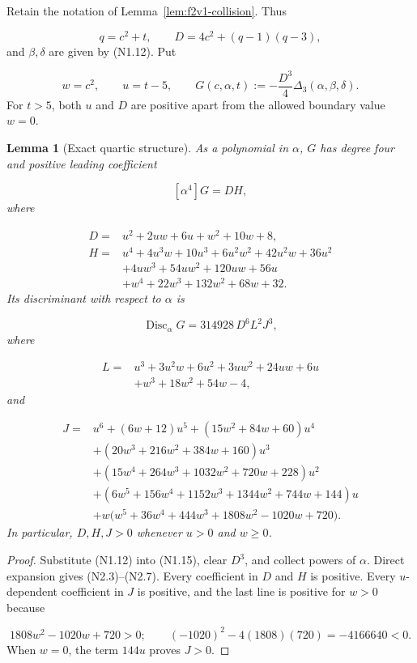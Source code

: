 \documentclass[11pt]{article}
\newtheorem{lemma}[theorem]{Lemma}
\theoremstyle{definition}
\theoremstyle{remark}
\begin{document}
Retain the notation of Lemma~\ref{lem:f2v1-collision}.  Thus

\[
 q=c^2+t,\qquad
 D=4c^2+(q-1)(q-3),
 \tag{N2.1}
\]
and \(\beta,\delta\) are given by \textup{(N1.12)}.  Put

\[
 w=c^2,\qquad u=t-5,
 \qquad
 G(c,\alpha,t):=-\frac{D^3}{4}
 \Delta_3(\alpha,\beta,\delta).
 \tag{N2.2}
\]
For \(t>5\), both \(u\) and \(D\) are positive apart from the allowed
boundary value \(w=0\).

\begin{lemma}[Exact quartic structure]
\label{lem:f2v2-structure}
As a polynomial in \(\alpha\), \(G\) has degree four and positive leading
coefficient

\[
 [\alpha^4]G=D H,
 \tag{N2.3}
\]
where

\[
\begin{aligned}
D={}&u^2+2uw+6u+w^2+10w+8,\\
H={}&u^4+4u^3w+10u^3+6u^2w^2+42u^2w+36u^2\\
 &+4uw^3+54uw^2+120uw+56u\\
 &+w^4+22w^3+132w^2+68w+32.
\end{aligned}
\tag{N2.4}
\]
Its discriminant with respect to \(\alpha\) is

\[
 \boxed{
 \operatorname{Disc}_{\alpha}G
 =314928\,D^6L^2J^3,}
 \tag{N2.5}
\]
where

\[
\begin{aligned}
L={}&u^3+3u^2w+6u^2+3uw^2+24uw+6u\\
   &+w^3+18w^2+54w-4,
\end{aligned}
\tag{N2.6}
\]
and

\[
\begin{aligned}
J={}&u^6+(6w+12)u^5+(15w^2+84w+60)u^4\\
&+(20w^3+216w^2+384w+160)u^3\\
&+(15w^4+264w^3+1032w^2+720w+228)u^2\\
&+(6w^5+156w^4+1152w^3+1344w^2+744w+144)u\\
&+w\bigl(w^5+36w^4+444w^3+1808w^2-1020w+720\bigr).
\end{aligned}
\tag{N2.7}
\]
In particular, \(D,H,J>0\) whenever \(u>0\) and \(w\ge0\).
\end{lemma}

\begin{proof}
Substitute \textup{(N1.12)} into \textup{(N1.15)}, clear \(D^3\),
and collect powers of \(\alpha\).  Direct expansion gives
\textup{(N2.3)}--\textup{(N2.7)}.  Every coefficient in \(D\) and \(H\)
is positive.  Every \(u\)-dependent coefficient in \(J\) is positive,
and the last line is positive for \(w>0\) because

\[
 1808w^2-1020w+720>0;
 \qquad
 (-1020)^2-4(1808)(720)=-4166640<0.
 \tag{N2.8}
\]
When \(w=0\), the term \(144u\) proves \(J>0\).
\end{proof}
\end{document}
